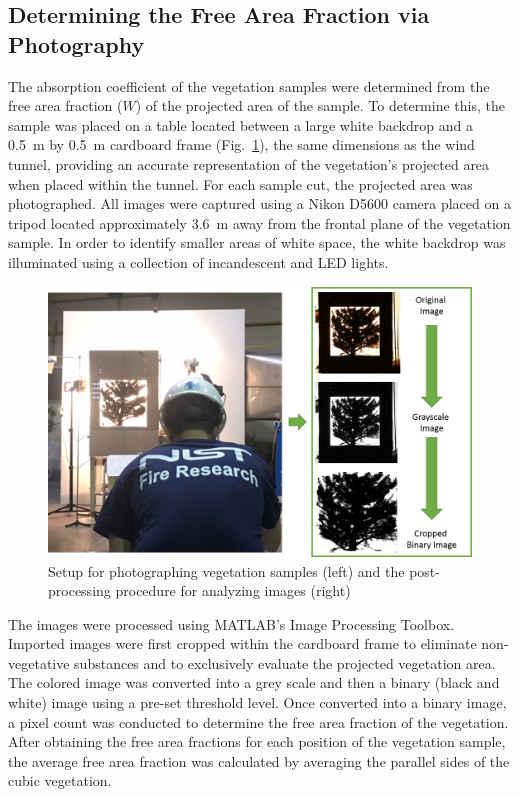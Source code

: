 \documentclass[12pt]{article}
\begin{document}
\subsection{Determining the Free Area Fraction via Photography}
\label{ssec:headingscap}

The absorption coefficient of the vegetation samples were determined from the free area fraction ($W$) of the projected area of the sample. To determine this, the sample was placed on a table located between a large white backdrop and a 0.5~m by 0.5~m cardboard frame (Fig.~\ref{fig:ImgAnaly}), the same dimensions as the wind tunnel, providing an accurate representation of the vegetation's projected area when placed within the tunnel. For each sample cut, the projected area was photographed. All images were captured using a Nikon D5600 camera placed on a tripod located approximately 3.6~\si{m} away from the frontal plane of the vegetation sample. In order to identify smaller areas of white space, the white backdrop was illuminated using a collection of incandescent and LED lights.

\begin{figure} [!h]
	\centering 	\includegraphics[width=1.0\linewidth]{Picture5.jpg}
	\caption[Setup for photographing vegetation samples]{Setup for photographing vegetation samples (left) and the post-processing procedure for analyzing images (right)}
	\label{fig:ImgAnaly}
\end{figure}

The images were processed using MATLAB's Image Processing Toolbox. Imported images were first cropped within the cardboard frame to eliminate non-vegetative substances and to exclusively evaluate the projected vegetation area. The colored image was converted into a grey scale and then a binary (black and white) image using a pre-set threshold level. Once converted into a binary image, a pixel count was conducted to determine the free area fraction of the vegetation. After obtaining the free area fractions for each position of the vegetation sample, the average free area fraction was calculated by averaging the parallel sides of the cubic vegetation.
\end{document}
